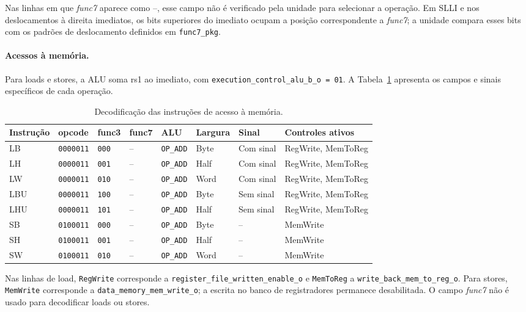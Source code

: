 Nas linhas em que \textit{func7} aparece como --, esse campo não é verificado pela unidade para selecionar a operação. Em SLLI e nos deslocamentos à direita imediatos, os bits superiores do imediato ocupam a posição correspondente a \textit{func7}; a unidade compara esses bits com os padrões de deslocamento definidos em \texttt{func7\_pkg}.

\paragraph{Acessos à memória.}
Para loads e stores, a ALU soma rs1 ao imediato, com \texttt{execution\_control\_alu\_b\_o = 01}. A Tabela~\ref{tab:control-unit-memory-decode} apresenta os campos e sinais específicos de cada operação.

\begin{table}[!htb]
\centering
\small
\caption{Decodificação das instruções de acesso à memória.}
\label{tab:control-unit-memory-decode}
\begin{tabular}{llllllll}
\toprule
\textbf{Instrução} & \textbf{opcode} & \textbf{func3} & \textbf{func7} & \textbf{ALU} & \textbf{Largura} & \textbf{Sinal} & \textbf{Controles ativos} \\
\midrule
LB  & \texttt{0000011} & \texttt{000} & -- & \texttt{OP\_ADD} & Byte & Com sinal & RegWrite, MemToReg \\
LH  & \texttt{0000011} & \texttt{001} & -- & \texttt{OP\_ADD} & Half & Com sinal & RegWrite, MemToReg \\
LW  & \texttt{0000011} & \texttt{010} & -- & \texttt{OP\_ADD} & Word & Com sinal & RegWrite, MemToReg \\
LBU & \texttt{0000011} & \texttt{100} & -- & \texttt{OP\_ADD} & Byte & Sem sinal & RegWrite, MemToReg \\
LHU & \texttt{0000011} & \texttt{101} & -- & \texttt{OP\_ADD} & Half & Sem sinal & RegWrite, MemToReg \\
\addlinespace
SB  & \texttt{0100011} & \texttt{000} & -- & \texttt{OP\_ADD} & Byte & -- & MemWrite \\
SH  & \texttt{0100011} & \texttt{001} & -- & \texttt{OP\_ADD} & Half & -- & MemWrite \\
SW  & \texttt{0100011} & \texttt{010} & -- & \texttt{OP\_ADD} & Word & -- & MemWrite \\
\bottomrule
\end{tabular}
\end{table}

Nas linhas de load, \texttt{RegWrite} corresponde a \texttt{register\_file\_written\_enable\_o} e \texttt{MemToReg} a \texttt{write\_back\_mem\_to\_reg\_o}. Para stores, \texttt{MemWrite} corresponde a \texttt{data\_memory\_mem\_write\_o}; a escrita no banco de registradores permanece desabilitada. O campo \textit{func7} não é usado para decodificar loads ou stores.

